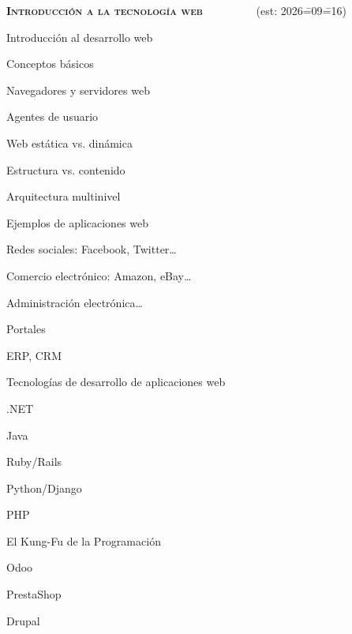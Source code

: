 \begin{longenum}
    \item \textbf{\textsc{Introducción a la tecnología web}} \ \ \ \ \ \ \ \ \ (est: 2026\==09\==16)
    \begin{longenum}
        \item Introducción al desarrollo web
        \begin{longenum}
            \item Conceptos básicos
            \begin{longenum}
                \item Navegadores y servidores web
                \item Agentes de usuario
                \item Web estática vs. dinámica
                \item Estructura vs. contenido
                \item Arquitectura multinivel
            \end{longenum}
            \item Ejemplos de aplicaciones web
            \begin{longenum}
                \item Redes sociales: Facebook, Twitter…
                \item Comercio electrónico: Amazon, eBay…
                \item Administración electrónica…
                \item Portales
                \item ERP, CRM
            \end{longenum}
            \item Tecnologías de desarrollo de aplicaciones web
            \begin{longenum}
                \item .NET
                \item Java
                \item Ruby/Rails
                \item Python/Django
                \item PHP
                \item El Kung-Fu de la Programación
                \begin{longenum}
                    \item Odoo
                    \item PrestaShop
                    \item Drupal

\end{longenum}
\end{longenum}
\end{longenum}
\end{longenum}
\end{longenum}
